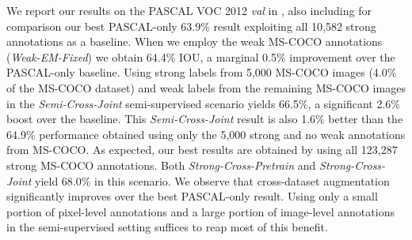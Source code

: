 We report our results on the PASCAL VOC 2012 \textsl{val} in
, also including for comparison our best
PASCAL-only 63.9\% result exploiting all 10,582 strong annotations as
a baseline. When we employ the weak MS-COCO annotations
(\textsl{Weak-EM-Fixed}) we obtain 64.4\% IOU, a marginal 0.5\%
improvement over the PASCAL-only baseline. Using strong labels from
5,000 MS-COCO images (4.0\% of the MS-COCO dataset) and weak labels
from the remaining MS-COCO images in the \textsl{Semi-Cross-Joint}
semi-supervised scenario yields 66.5\%, a significant 2.6\% boost over
the baseline. This \textsl{Semi-Cross-Joint} result is also 1.6\%
better than the 64.9\% performance obtained using only the 5,000
strong and no weak annotations from MS-COCO. As expected, our best
results are obtained by using all 123,287 strong MS-COCO
annotations. Both \textsl{Strong-Cross-Pretrain} and
\textsl{Strong-Cross-Joint} yield 68.0\% in this scenario. We observe
that cross-dataset augmentation significantly improves over the best
PASCAL-only result. Using only a small portion of pixel-level
annotations and a large portion of image-level annotations in the
semi-supervised setting suffices to reap most of this benefit.

\begin{table}[t]
  \centering
  \caption{DeepLab-CRF VOC 2012 \textsl{val} IOU (\%) performance
    using strong annotations for all 10,582 \textsl{train\_aug} PASCAL
    images and a varying number of strong and weak MS-COCO
    annotations.}
  \label{tab:cross_data}
\end{table}

